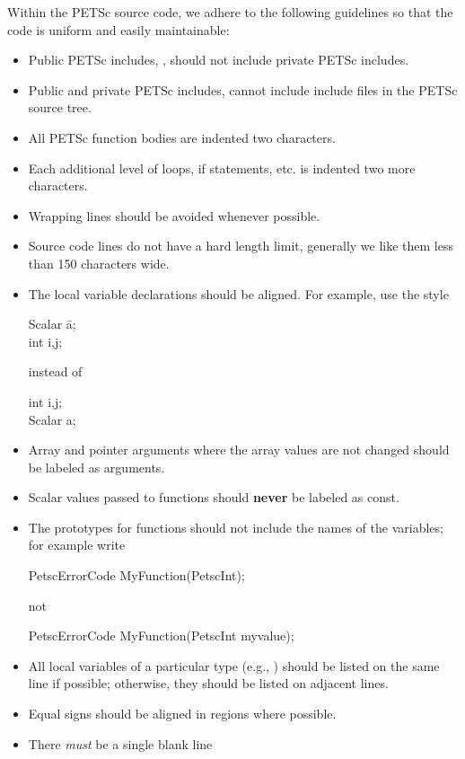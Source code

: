 \documentclass[twoside,12pt]{../sty/report_petsc}
\begin{document}
Within the PETSc source code, we adhere to the following guidelines
so that the code is uniform and easily maintainable:

\begin{itemize}
\item Public PETSc includes, , should not include private PETSc  includes.
\item Public and private PETSc includes, cannot include include files in the PETSc source tree.
\item All PETSc function bodies are indented two characters.
\item Each additional level of loops, if statements, etc. is indented
      two more characters.
\item Wrapping lines should be avoided whenever possible.
\item Source code lines do not have a hard length limit, generally we like them less than 150 characters wide.
\item The local variable declarations should be aligned. For example,
      use the style
\begin{tabbing}
   Scalar \=a;\\
   int \>i,j;\\
\end{tabbing}
instead of
\begin{tabbing}
   int    i,j;\\
   Scalar a;
\end{tabbing}
\item Array and pointer arguments where the array values are not changed should be labeled as  arguments.
\item Scalar values passed to functions should {\bf never} be labeled as const.
\item The prototypes for functions should not include the names of the variables; for example write
\begin{tabbing}
PetscErrorCode MyFunction(PetscInt);
\end{tabbing}
not
\begin{tabbing}
PetscErrorCode MyFunction(PetscInt myvalue);
\end{tabbing}
\item All local variables of a particular type (e.g., ) should be
      listed on the same line if possible; otherwise, they should be listed
      on adjacent lines.
\item Equal signs should be aligned in regions where possible.
\item There {\em must} be a single blank line

\end{itemize}
\end{document}
